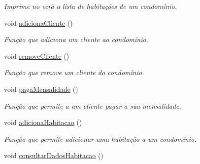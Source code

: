 \begin{DoxyCompactItemize}
\begin{DoxyCompactList}\small\item\em Imprime no ecrã a lista de habitações de um condomínio. \end{DoxyCompactList}\item 
void \hyperlink{class_interface_af3b831e11a69de725ed8454e03b41b18}{adiciona\+Cliente} ()\hypertarget{class_interface_af3b831e11a69de725ed8454e03b41b18}{}\label{class_interface_af3b831e11a69de725ed8454e03b41b18}

\begin{DoxyCompactList}\small\item\em Função que adiciona um cliente ao condomínio. \end{DoxyCompactList}\item 
void \hyperlink{class_interface_a7c65a253d09316fd93ca81d1a2e8587a}{remove\+Cliente} ()\hypertarget{class_interface_a7c65a253d09316fd93ca81d1a2e8587a}{}\label{class_interface_a7c65a253d09316fd93ca81d1a2e8587a}

\begin{DoxyCompactList}\small\item\em Função que remove um cliente do condomínio. \end{DoxyCompactList}\item 
void \hyperlink{class_interface_aaad57b1cee2e56f7468b29522ff26822}{paga\+Mensalidade} ()\hypertarget{class_interface_aaad57b1cee2e56f7468b29522ff26822}{}\label{class_interface_aaad57b1cee2e56f7468b29522ff26822}

\begin{DoxyCompactList}\small\item\em Função que permite a um cliente pagar a sua mensalidade. \end{DoxyCompactList}\item 
void \hyperlink{class_interface_a1cb89458dd7b90cd1b0b52ad429dd898}{adiciona\+Habitacao} ()\hypertarget{class_interface_a1cb89458dd7b90cd1b0b52ad429dd898}{}\label{class_interface_a1cb89458dd7b90cd1b0b52ad429dd898}

\begin{DoxyCompactList}\small\item\em Função que permite adicionar uma habitação a um condomínio. \end{DoxyCompactList}\item 
void \hyperlink{class_interface_a538aebd288ba7ebe79560d7d3263bf1a}{consultar\+Dados\+Habitacao} ()\hypertarget{class_interface_a538aebd288ba7ebe79560d7d3263bf1a}{}\label{class_interface_a538aebd288ba7ebe79560d7d3263bf1a}


\end{DoxyCompactItemize}
